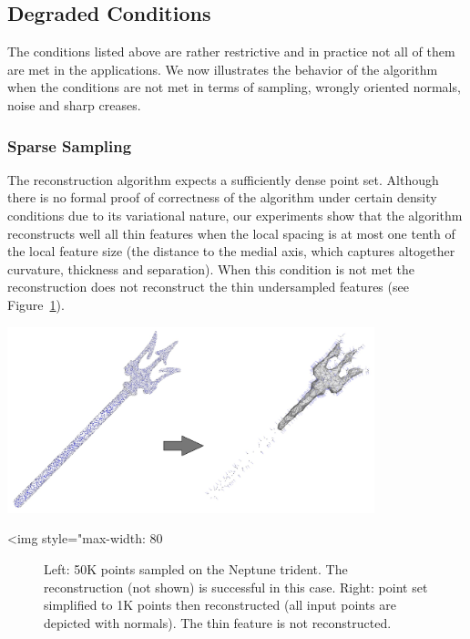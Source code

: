 \subsection{Degraded Conditions}

The conditions listed above are rather restrictive and in practice not all of them are met in the applications. We now illustrates the behavior of the algorithm when the conditions are not met in terms of sampling, wrongly oriented normals, noise and sharp creases.

\subsubsection{Sparse Sampling}

The reconstruction algorithm expects a sufficiently dense point set. Although there is no formal proof of correctness of the algorithm under certain density conditions due to its variational nature, our experiments show that the algorithm reconstructs well all thin features when the local spacing is at most one tenth of the local feature size (the distance to the medial axis, which captures altogether curvature, thickness and separation). When this condition is not met the reconstruction does not reconstruct the thin undersampled features (see Figure~\ref{Surface_reconstruction_points_3-fig-sampling}).

\begin{center}
    \begin{ccTexOnly}
        \includegraphics[width=0.8\textwidth]{Surface_reconstruction_points_3/sampling}
    \end{ccTexOnly}
    \begin{ccHtmlOnly}
        <img style="max-width: 80%
    \end{ccHtmlOnly}
    \begin{figure}[h]
        \caption{Left: 50K points sampled on the Neptune trident.
                 The reconstruction (not shown) is successful in this case.
                 Right: point set simplified to 1K points then reconstructed
                 (all input points are depicted with normals). The thin
                 feature is not reconstructed.}
        \label{Surface_reconstruction_points_3-fig-sampling}
    \end{figure}
\end{center}


